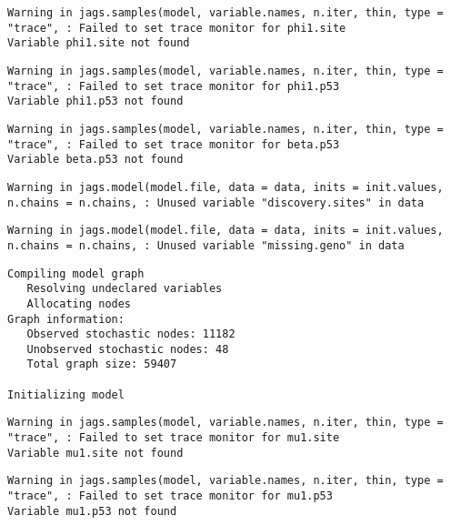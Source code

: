 \documentclass[12pt,twoside]{dukestatscithesis}
\theoremstyle{definition}
\theoremstyle{definition}
\theoremstyle{definition}
\theoremstyle{remark}
\begin{document}
\begin{verbatim}
Warning in jags.samples(model, variable.names, n.iter, thin, type = "trace", : Failed to set trace monitor for phi1.site
Variable phi1.site not found
\end{verbatim}
\begin{verbatim}
Warning in jags.samples(model, variable.names, n.iter, thin, type = "trace", : Failed to set trace monitor for phi1.p53
Variable phi1.p53 not found
\end{verbatim}
\begin{verbatim}
Warning in jags.samples(model, variable.names, n.iter, thin, type = "trace", : Failed to set trace monitor for beta.p53
Variable beta.p53 not found
\end{verbatim}
\begin{Shaded}
\begin{Highlighting}[]
\StringTok{ }\NormalTok{(}\NormalTok{, }
\end{Highlighting}
\end{Shaded}
\begin{verbatim}
Warning in jags.model(model.file, data = data, inits = init.values,
n.chains = n.chains, : Unused variable "discovery.sites" in data
\end{verbatim}
\begin{verbatim}
Warning in jags.model(model.file, data = data, inits = init.values,
n.chains = n.chains, : Unused variable "missing.geno" in data
\end{verbatim}
\begin{verbatim}
Compiling model graph
   Resolving undeclared variables
   Allocating nodes
Graph information:
   Observed stochastic nodes: 11182
   Unobserved stochastic nodes: 48
   Total graph size: 59407

Initializing model
\end{verbatim}
\begin{verbatim}
Warning in jags.samples(model, variable.names, n.iter, thin, type = "trace", : Failed to set trace monitor for mu1.site
Variable mu1.site not found
\end{verbatim}
\begin{verbatim}
Warning in jags.samples(model, variable.names, n.iter, thin, type = "trace", : Failed to set trace monitor for mu1.p53
Variable mu1.p53 not found
\end{verbatim}
\end{document}
